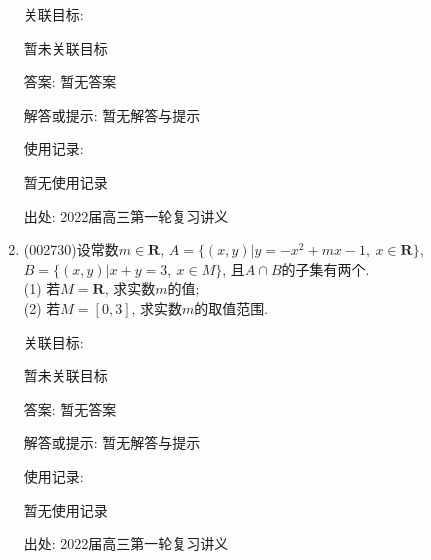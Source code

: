 \documentclass[10pt,a4paper]{article}
\begin{document}
\begin{enumerate}[1.]
关联目标:

暂未关联目标

答案: 暂无答案

解答或提示: 暂无解答与提示

使用记录:

暂无使用记录


出处: 2022届高三第一轮复习讲义
\item { (002730)}设常数$m\in \mathbf{R}$, $A=\{(x,y)|y=-x^2+mx-1,\ x\in \mathbf{R}\}$, $B=\{(x,y)|x+y=3,\ x\in M\}$, 且$A\cap B$的子集有两个.\\
(1) 若$M=\mathbf{R}$, 求实数$m$的值;\\
(2) 若$M=[0,3]$, 求实数$m$的取值范围.


关联目标:

暂未关联目标

答案: 暂无答案

解答或提示: 暂无解答与提示

使用记录:

暂无使用记录


出处: 2022届高三第一轮复习讲义
\end{enumerate}
\end{document}
